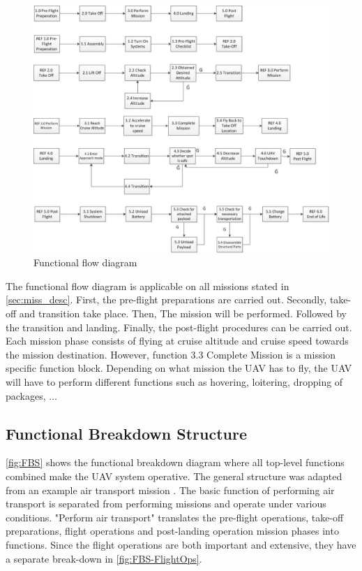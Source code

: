 \begin{figure}[htb]
\centering
\includegraphics[width=\textwidth]{./ProjectDescription/Figures/ALL}
\caption{Functional flow diagram}
\label{fig:FuncFlow}
\end{figure}

The functional flow diagram is applicable on all missions stated in \autoref{sec:miss_desc}. First, the pre-flight preparations are carried out. Secondly, take-off and transition take place. Then, The mission will be performed. Followed by the transition and landing. Finally, the post-flight procedures can be carried out. Each mission phase consists of flying at cruise altitude and cruise speed towards the mission destination. However, function 3.3 Complete Mission is a mission specific function block. Depending on what mission the UAV has to fly, the UAV will have to perform different functions such as hovering, loitering, dropping of packages, ...

\subsection{Functional Breakdown Structure}

\autoref{fig:FBS} shows the functional breakdown diagram where all top-level functions combined make the UAV system operative. The general structure was adapted from an example air transport mission \cite{SE_notes_2006}. The basic function of performing air transport is separated from performing missions and operate under various conditions. "Perform air transport" translates the pre-flight operations, take-off preparations, flight operations and post-landing operation mission phases into functions. Since the flight operations are both important and extensive, they have a separate break-down in \autoref{fig:FBS-FlightOps}. 

